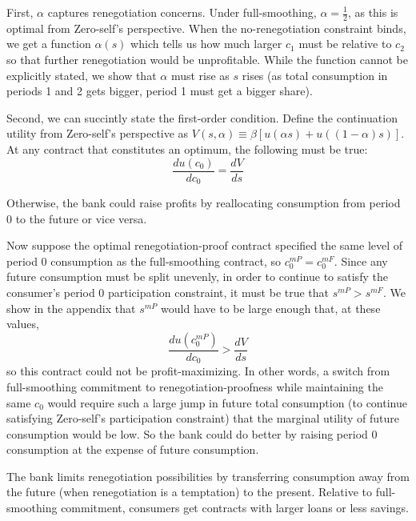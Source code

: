 \documentclass[11pt,english]{article}
\theoremstyle{plain}
\theoremstyle{definition}
\begin{document}
First, $\alpha$ captures renegotiation concerns. Under full-smoothing,
$\alpha=\frac{1}{2}$, as this is optimal from Zero-self's perspective.
When the no-renegotiation constraint binds, we get a function $\alpha\left(s\right)$
which tells us how much larger $c_{1}$ must be relative to $c_{2}$
so that further renegotiation would be unprofitable. While the function
cannot be explicitly stated, we show that $\alpha$ must rise as $s$
rises (as total consumption in periods 1 and 2 gets bigger, period
1 must get a bigger share).

Second, we can succintly state the first-order condition. 
Define the continuation utility from Zero-self's perspective as 
$V\left(s,\alpha\right)\equiv 
\beta\left[u\left(\alpha s\right)+u\left(\left(1-\alpha\right)s\right)\right]$.
At any contract that constitutes an optimum, the following must be true:
\begin{equation}
\frac{du\left(c_{0}\right)}{dc_{0}}=\frac{dV}{ds}\label{eq:foc-newnotation}
\end{equation}

Otherwise, the bank could raise profits by reallocating consumption
from period 0 to the future or vice versa.

Now suppose the optimal renegotiation-proof contract specified the
same level of period 0 consumption as the full-smoothing contract,
so $c_{0}^{mP}=c_{0}^{mF}$. Since any future consumption must be
split unevenly, in order to continue to satisfy the consumer's period
0 participation constraint, it must be true that $s^{mP}>$$s^{mF}$.
We show in the appendix that $s^{mP}$ would have to be large enough
that, at these values,
\begin{equation}
\frac{du\left(c_{0}^{mP}\right)}{dc_{0}}>\frac{dV}{ds}
\end{equation}
so this contract could not be profit-maximizing. In other words, a
switch from full-smoothing commitment to renegotiation-proofness while
maintaining the same $c_{0}$ would require such a large jump in future
total consumption (to continue satisfying Zero-self's participation
constraint) that the marginal utility of future consumption would
be low. So the bank could do better by raising period 0 consumption
at the expense of future consumption. 

The bank limits renegotiation possibilities by transferring consumption
away from the future (when renegotiation is a temptation) to the present.
Relative to full-smoothing commitment, consumers get contracts with
larger loans or less savings.
\end{document}
